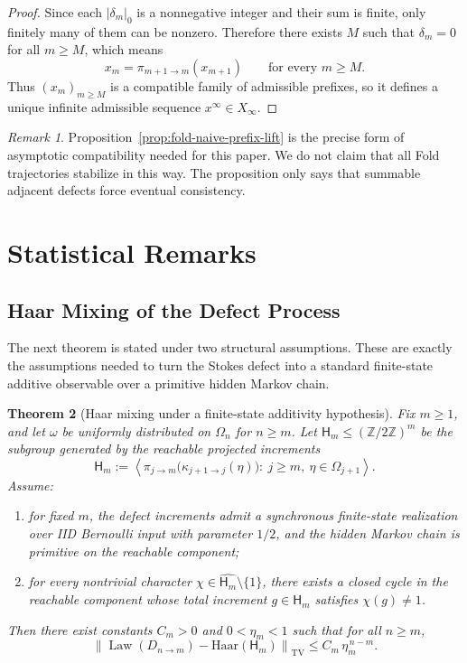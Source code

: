\documentclass[11pt,letterpaper]{article}
\numberwithin{equation}{section}
\theoremstyle{plain}
\newtheorem{theorem}{Theorem}[section]
\theoremstyle{definition}
\theoremstyle{remark}
\newtheorem{remark}[theorem]{Remark}
\newcommand{\ZZ}{\mathbb{Z}}
\newcommand{\Xinf}{X_\infty}
\DeclareMathOperator{\Law}{Law}
\begin{document}
\begin{proof}
Since each $\lvert\delta_m\rvert_0$ is a nonnegative integer and their sum is
finite, only finitely many of them can be nonzero.  Therefore there exists $M$
such that $\delta_m=0$ for all $m\ge M$, which means
\[
x_m=\pi_{m+1\to m}(x_{m+1})
\qquad\text{for every }m\ge M.
\]
Thus $(x_m)_{m\ge M}$ is a compatible family of admissible prefixes, so it
defines a unique infinite admissible sequence $x^\infty\in\Xinf$.
\end{proof}

\begin{remark}
Proposition~\ref{prop:fold-naive-prefix-lift} is the precise form of asymptotic
compatibility needed for this paper.  We do not claim that all Fold trajectories
stabilize in this way.  The proposition only says that summable adjacent defects
force eventual consistency.
\end{remark}

\section{Statistical Remarks}

\subsection{Haar Mixing of the Defect Process}

The next theorem is stated under two structural assumptions.  These are exactly
the assumptions needed to turn the Stokes defect into a standard finite-state
additive observable over a primitive hidden Markov chain.

\begin{theorem}[Haar mixing under a finite-state additivity hypothesis]
\label{thm:fold-stokes-defect-haar-mixing}
Fix $m\ge 1$, and let $\omega$ be uniformly distributed on $\Omega_n$ for
$n\ge m$.  Let $\mathsf{H}_m\le (\ZZ/2\ZZ)^m$ be the subgroup generated by the
reachable projected increments
\[
\mathsf{H}_m
:=
\left\langle
\pi_{j\to m}\bigl(\kappa_{j+1\to j}(\eta)\bigr):
\ j\ge m,\ \eta\in\Omega_{j+1}
\right\rangle.
\]
Assume:
\begin{enumerate}[label=(\roman*)]
\item for fixed $m$, the defect increments admit a synchronous finite-state
realization over IID Bernoulli input with parameter $1/2$, and the hidden
Markov chain is primitive
on the reachable component;
\item for every nontrivial character
$\chi\in\widehat{\mathsf{H}_m}\setminus\{1\}$, there exists a closed cycle in
the reachable component whose total increment $g\in \mathsf{H}_m$ satisfies
$\chi(g)\neq 1$.
\end{enumerate}
Then there exist constants $C_m>0$ and $0<\eta_m<1$ such that for all $n\ge m$,
\[
\left\|
\Law(D_{n\to m})-\mathrm{Haar}(\mathsf{H}_m)
\right\|_{\mathrm{TV}}
\le
C_m\,\eta_m^{\,n-m}.
\]
\end{theorem}
\end{document}

